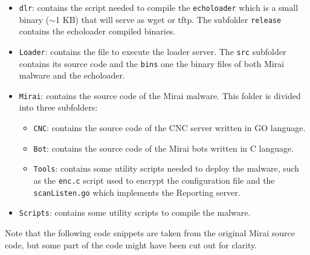 \begin{itemize}
    \item \texttt{dlr}: contains the script needed to compile the \texttt{echoloader} which is a small binary ($\sim$1 KB) that will serve as wget or tftp. The subfolder \texttt{release} contains the echoloader compiled binaries.
    \item \texttt{Loader}: contains the file to execute the loader server. The \texttt{src} subfolder contains its source code and the \texttt{bins} one the binary files of both Mirai malware and the echoloader. 
    \item \texttt{Mirai}: contains the source code of the Mirai malware. This folder is divided into three subfolders:
    \begin{itemize}
        \item \texttt{CNC}: contains the source code of the CNC server written in GO language. 
        \item \texttt{Bot}: contains the source code of the Mirai bots written in C language.
        \item \texttt{Tools}: contains some utility scripts needed to deploy the malware, such as the \texttt{enc.c} script used to encrypt the configuration file and the \texttt{scanListen.go} which implements the Reporting server.
    \end{itemize}
    \item \texttt{Scripts}: contains some utility scripts to compile the malware.
\end{itemize}

Note that the following code snippets are taken from the original Mirai source code, but some part of the code might have been cut out for clarity.

